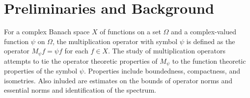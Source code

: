 \documentclass[11 pt]{report}
\theoremstyle{definition}
\theoremstyle{definition}
\begin{document}



\tableofcontents



\abstractpage





\startofchapters

%

\pagebreak

\chapter{Preliminaries and Background}
 
\indent \indent For a complex Banach space $X$ of functions on a set $\Omega$ and a complex-valued function $\psi$ on $\Omega$, the multiplication operator with symbol $\psi$ is defined as the operator $M_\psi f = \psi f$ for each $f \in X$. The study of multiplication operators attempts to tie the operator theoretic properties of $M_\psi$ to the function theoretic properties of the symbol $\psi$. Properties include boundedness, compactness, and isometries. Also inluded are estimates on the bounds of operator norms and essential norms and identification of the spectrum.
\end{document}
